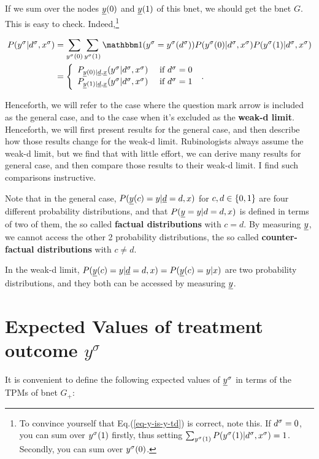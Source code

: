 If we sum over the
nodes $\rvy(0)$ and $\rvy(1)$
of this bnet, we should
get the bnet $G$.
This is easy to check. Indeed,\footnote{To
convince yourself that Eq.(\ref{eq-y-is-y-td})
 is correct, note this.
If $d^\sigma=0$, you can sum over
$y^\sigma(1)$ firstly, thus
setting $\sum_{y^\sigma(1)}P(y^\sigma(1)|d^\sigma, x^\sigma)=1$. 
Secondly, you can sum over $y^\sigma(0)$.}

\begin{align}
P(y^\s|d^\s, x^\s)
&=
\sum_{y^\s(0)}
\sum_{y^\s(1)}
\indi(y^\s= y^\s(d^\s))
P(y^\s(0)|d^\s, x^\s)
P(y^\s(1)|d^\s, x^\s)
\\
&=
\left\{
\begin{array}{ll}
P_{\rvy(0)|\rvd, \rvx}(
y^\s|d^\s, x^\s)&\text{ if }
d^\s=0
\\
P_{\rvy(1)|\rvd, \rvx}(
y^\s|d^\s, x^\s)&\text{ if }
d^\s=1
\end{array}
\right.
\;.
\label{eq-y-is-y-td}
\end{align}

Henceforth,
we will refer
to the case where
the question mark
arrow is included as
the general case,
and to the case when it's excluded
as the {\bf weak-d limit}.
Henceforth, we
will first present
results for the
general case,
and then
describe how  those
results
change for the
weak-d limit.
Rubinologists
always assume the
weak-d limit, but
we find that
with little effort,
we can derive
many results for
general case, and
then compare those
results
to their weak-d limit.
I find such
comparisons instructive.

Note that in the general case,
$P(\rvy(c)=y|\rvd=d, x)$
for $c, d\in \{0,1\}$
are four
different probability
distributions,
and that
$P(\rvy=y|d=d,x)$
is defined in terms
of two of them, the
so called {\bf factual
distributions} with $c=d$.
By measuring $\rvy$,
we cannot access the other
2 probability distributions,
the so called {\bf counter-factual
distributions}
with $c\neq d$.

In the weak-d limit,
$P(\rvy(c)=y|\rvd=d, x
)=P(\rvy(c)=y|x)$ are
two probability
distributions,
and they both
can be accessed
by measuring $\rvy$.





\section{Expected Values of
 treatment outcome $y^\sigma$}

It is convenient
to define
the following
expected values of
$\rvy^\s$
in terms of the TPMs of
bnet $G_{+}$:

